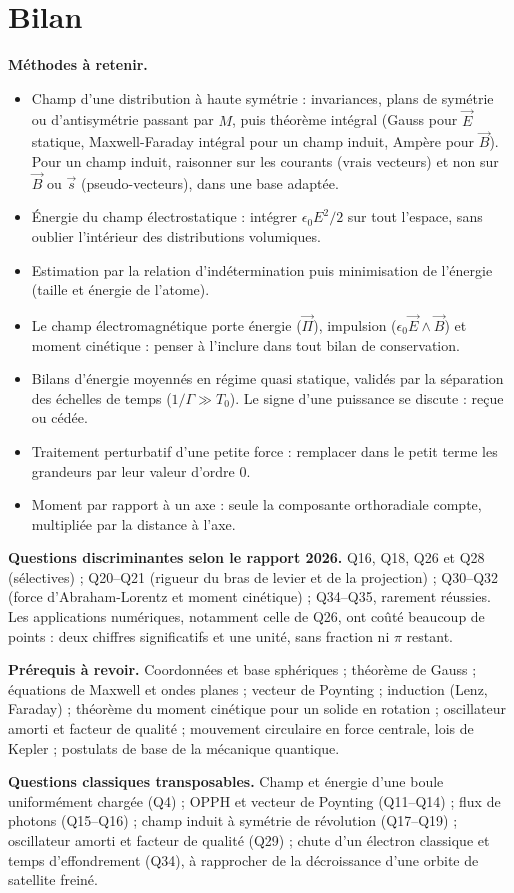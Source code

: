 \documentclass[11pt,a4paper]{article}
\providecommand{\tightlist}{\setlength{\itemsep}{0pt}\setlength{\parskip}{0pt}}
\begin{document}
\hypertarget{bilan}{%
\section{Bilan}\label{bilan}}

\textbf{Méthodes à retenir.}

\begin{itemize}
\tightlist
\item
  Champ d'une distribution à haute symétrie : invariances, plans de symétrie ou d'antisymétrie passant par \(M\), puis théorème intégral (Gauss pour \(\vec E\) statique, Maxwell-Faraday intégral pour un champ induit, Ampère pour \(\vec B\)). Pour un champ induit, raisonner sur les courants (vrais vecteurs) et non sur \(\vec B\) ou \(\vec s\) (pseudo-vecteurs), dans une base adaptée.
\item
  Énergie du champ électrostatique : intégrer \(\epsilon_0E^2/2\) sur tout l'espace, sans oublier l'intérieur des distributions volumiques.
\item
  Estimation par la relation d'indétermination puis minimisation de l'énergie (taille et énergie de l'atome).
\item
  Le champ électromagnétique porte énergie (\(\vec\Pi\)), impulsion (\(\epsilon_0\vec E\wedge\vec B\)) et moment cinétique : penser à l'inclure dans tout bilan de conservation.
\item
  Bilans d'énergie moyennés en régime quasi statique, validés par la séparation des échelles de temps (\(1/\Gamma\gg T_0\)). Le signe d'une puissance se discute : reçue ou cédée.
\item
  Traitement perturbatif d'une petite force : remplacer dans le petit terme les grandeurs par leur valeur d'ordre 0.
\item
  Moment par rapport à un axe : seule la composante orthoradiale compte, multipliée par la distance à l'axe.
\end{itemize}

\textbf{Questions discriminantes selon le rapport 2026.} Q16, Q18, Q26 et Q28 (sélectives) ; Q20--Q21 (rigueur du bras de levier et de la projection) ; Q30--Q32 (force d'Abraham-Lorentz et moment cinétique) ; Q34--Q35, rarement réussies. Les applications numériques, notamment celle de Q26, ont coûté beaucoup de points : deux chiffres significatifs et une unité, sans fraction ni \(\pi\) restant.

\textbf{Prérequis à revoir.} Coordonnées et base sphériques ; théorème de Gauss ; équations de Maxwell et ondes planes ; vecteur de Poynting ; induction (Lenz, Faraday) ; théorème du moment cinétique pour un solide en rotation ; oscillateur amorti et facteur de qualité ; mouvement circulaire en force centrale, lois de Kepler ; postulats de base de la mécanique quantique.

\textbf{Questions classiques transposables.} Champ et énergie d'une boule uniformément chargée (Q4) ; OPPH et vecteur de Poynting (Q11--Q14) ; flux de photons (Q15--Q16) ; champ induit à symétrie de révolution (Q17--Q19) ; oscillateur amorti et facteur de qualité (Q29) ; chute d'un électron classique et temps d'effondrement (Q34), à rapprocher de la décroissance d'une orbite de satellite freiné.
\end{document}
